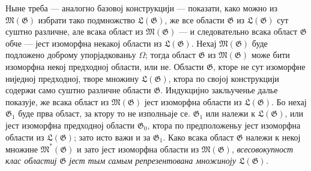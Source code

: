 ﻿\documentclass[11pt]{article}
\begin{document}
Ныне треба --- аналогно базовој конструкцији --- показати, како можно из
$\mathfrak M(\mathfrak G)$ избрати тако подмножство
$\mathfrak L(\mathfrak G)$, же все области $\mathfrak G$ из
$\mathfrak L(\mathfrak G)$ сут суштно различне, але всака област из
$\mathfrak M(\mathfrak G)$ --- и следовательно всака област $\mathfrak G$
обче --- јест изоморфна некакој области из $\mathfrak L(\mathfrak G)$. Нехај
$\mathfrak M(\mathfrak G)$ буде подложено доброму упорјадкованьу $\Omega$;
тогда област $\mathfrak G$ из $\mathfrak M(\mathfrak G)$ може бити изоморфна
некој предходној области, или не. Области $\mathfrak G$, кторе не сут
изоморфне ниједној предходној, творе множину $\mathfrak L(\mathfrak G)$, ктора
по својој конструкцији содержи само суштно различне области $\mathfrak G$.
Индукцијно закльученье далье показује, же всака област из
$\mathfrak M(\mathfrak G)$ јест изоморфна области из
$\mathfrak L(\mathfrak G)$. Бо нехај $\mathfrak G_1$ буде прва област, за
ктору то не изполньаје се. $\mathfrak G_1$ или належи к
$\mathfrak L(\mathfrak G)$, или јест изоморфна предходној области
$\mathfrak G_0$, ктора по предположеньу јест изоморфна области из
$\mathfrak L(\mathfrak G)$; зато исто важи и за $\mathfrak G_1$. Како всака
област $\mathfrak G$ належи к некој множине $\mathfrak M^*(\mathfrak G)$ и
зато јест изоморфна области из $\mathfrak M(\mathfrak G)$, {\itshape
всесовокупност клас областиј $\mathfrak G$ јест тым самым репрезентована
множиноју $\mathfrak L(\mathfrak G)$.}
\end{document}
